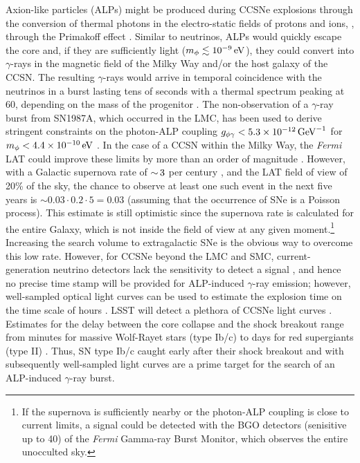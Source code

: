 Axion-like particles (ALPs) might be produced during CCSNe explosions through the conversion of thermal photons in the electro-static fields of protons and ions, \ie, through the Primakoff effect \citep{1996slfp.book.....R}.  
Similar to neutrinos, ALPs would quickly escape the core and, if they are sufficiently light ($m_\phi \lesssim 10^{-9} \mathrm{\,eV}$), they could convert into $\gamma$-rays in the magnetic field of the Milky Way and/or the host galaxy of the CCSN. 
The resulting $\gamma$-rays would arrive in temporal coincidence with the neutrinos in a burst lasting tens of seconds with a 
thermal spectrum peaking at 60\MeV, depending on the mass of the progenitor \citep{2015JCAP...02..006P}.
The non-observation of a $\gamma$-ray burst from SN1987A, which occurred in the LMC, has been used to derive stringent constraints on the photon-ALP coupling $g_{\phi\gamma}<5.3\times10^{-12}\mathrm{\,GeV}^{-1}$ for $m_\phi < 4.4\times10^{-10}\mathrm{\,eV}$ \citep{1996PhLB..383..439B, 1996PhRvL..77.2372G,2015JCAP...02..006P}.
In the case of a CCSN within the Milky Way, the \textit{Fermi} LAT could improve these limits by more than an order of magnitude \citep{2017PhRvL.118a1103M}. 
However, with a Galactic supernova rate of $ {\sim}\, 3$ per century \citep[\eg,][]{2013ApJ...778..164A}, and the LAT field of view of 20\% of the sky, the chance to observe at least one such event in the next five years is $\sim 0.03 \cdot 0.2 \cdot 5 = 0.03$ (assuming that the occurrence of SNe is a Poisson process). This estimate is still optimistic since the supernova rate is calculated for the entire Galaxy, which is not inside the field of view at any given moment.\footnote{If the supernova is sufficiently nearby or the photon-ALP coupling is close to current limits, a signal could be detected with the BGO detectors (senisitive up to 40\MeV) of the \emph{Fermi} Gamma-ray Burst Monitor, which observes the entire unocculted sky.}
Increasing the search volume to extragalactic SNe is the obvious way to overcome this low rate. 
However, for CCSNe beyond the LMC and SMC, current-generation neutrino detectors lack the sensitivity to detect a signal \citep[\eg,][]{2011PhRvD..83l3008K}, and hence no precise time stamp will be provided for ALP-induced $\gamma$-ray emission; however, well-sampled optical light curves can be used to estimate the explosion time on the time scale of hours \citep{2010APh....33...19C}. 
LSST will detect a plethora of CCSNe light curves \citep{Lien:2009}. 
Estimates for the delay between the core collapse and the shock breakout range from minutes for massive Wolf-Rayet stars (type Ib/c) to days for red supergiants (type II) \citep{2013ApJ...778...81K}. 
Thus, SN type Ib/c caught early after their shock breakout and with subsequently well-sampled light curves are a prime target for the search of an ALP-induced $\gamma$-ray burst. 

